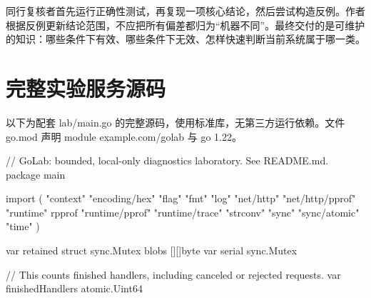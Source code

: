 \documentclass[UTF8,fontset=fandol,openany,11pt]{ctexbook}
\begin{document}
同行复核者首先运行正确性测试，再复现一项核心结论，然后尝试构造反例。作者根据反例更新结论范围，不应把所有偏差都归为“机器不同”。最终交付的是可维护的知识：哪些条件下有效、哪些条件下无效、怎样快速判断当前系统属于哪一类。

\section{完整实验服务源码}
以下为配套 lab/main.go 的完整源码，使用标准库，无第三方运行依赖。文件 go.mod 声明 module example.com/golab 与 go 1.22。

\begin{codeblock}
// GoLab: bounded, local-only diagnostics laboratory. See README.md.
package main

import (
	"context"
	"encoding/hex"
	"flag"
	"fmt"
	"log"
	"net/http"
	"net/http/pprof"
	"runtime"
	rpprof "runtime/pprof"
	"runtime/trace"
	"strconv"
	"sync"
	"sync/atomic"
	"time"
)

var retained struct {
	sync.Mutex
	blobs [][]byte
}
var serial sync.Mutex

// This counts finished handlers, including canceled or rejected requests.
var finishedHandlers atomic.Uint64


\end{codeblock}
\end{document}
